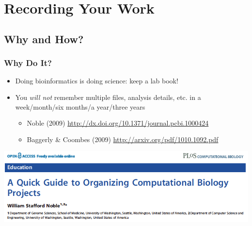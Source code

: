 \documentclass[table]{beamer}
\begin{document}
   \section{Recording Your Work}
   
   \subsection{Why and How?}
   \begin{frame}
     \frametitle{Why Do It?}
     \begin{itemize}
	   \item Doing bioinformatics is doing science: keep a lab book!
	   \item You \emph{will not} remember multiple files, analysis details, etc. in a week/month/six months/a year/three years
	   \begin{itemize}
	     \item Noble (2009) \url{http://dx.doi.org/10.1371/journal.pcbi.1000424}
	     \item Baggerly \& Coombes (2009) \url{http://arxiv.org/pdf/1010.1092.pdf}
	   \end{itemize}
	\end{itemize}
	\includegraphics[width=.6\textwidth]{images/noble_2009_head}
   \end{frame}
   
\end{document}
